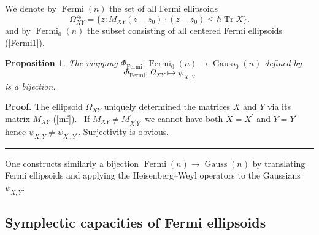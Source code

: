 \documentclass[11pt]{article}%
\newtheorem{proposition}[theorem]{Proposition}
\newenvironment{proof}[1][Proof]{\noindent\textbf{#1.} }{\ \rule{0.5em}{0.5em}}
\begin{document}
We denote by $\operatorname{Fermi}(n)$ the set of all Fermi ellipsoids%
\begin{equation}
\Omega_{XY}^{z_{0}}=\{z:M_{XY}(z-z_{0})\cdot(z-z_{0})\leq\hbar
\operatorname*{Tr}X\}. \label{Fermi2}%
\end{equation}
and by $\operatorname{Fermi}_{0}(n)$ the subset consisting of all centered
Fermi ellipsoids (\ref{Fermi1}).

\begin{proposition}
The mapping $\Phi_{\operatorname{Fermi}}:\operatorname{Fermi}_{0}%
(n)\longrightarrow\operatorname*{Gauss}_{0}(n)$ defined by%
\[
\Phi_{\operatorname{Fermi}}:\Omega_{XY}\longmapsto\psi_{X,Y}%
\]
is a bijection.
\end{proposition}

\begin{proof}
The ellipsoid $\Omega_{XY}$ uniquely determined the matrices $X$ and $Y$ via
its matrix $M_{XY}$ (\ref{mf}). \ If $M_{XY}\neq M_{X^{\prime}Y^{\prime}%
}^{\prime}$ we cannot have both $X=X^{\prime}$ and $Y=Y^{\prime}$ hence
$\psi_{X,Y}\neq\psi_{X^{\prime},Y^{\prime}}$. Surjectivity is obvious.
\end{proof}

One constructs similarly a bijection $\operatorname{Fermi}(n)\longrightarrow
\operatorname*{Gauss}(n)$ by translating Fermi ellipsoids and applying the
Heisenberg--Weyl operators to the Gaussians $\psi_{X,Y}$.

\subsection{Symplectic capacities of Fermi ellipsoids}
\end{document}
